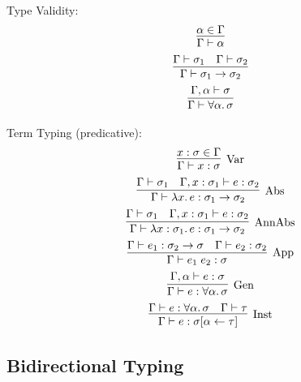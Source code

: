 Type Validity:
\begin{gather*}
  \infer{
    \Gamma \vdash \alpha
  }{
    \alpha \in \Gamma
  }
  \\
  \infer{
    \Gamma \vdash \sigma_1 \to \sigma_2
  }{
    \Gamma \vdash \sigma_1
    &
    \Gamma \vdash \sigma_2
  }
  \\
  \infer{
    \Gamma \vdash \forall \alpha\ldotp \sigma
  }{
    \Gamma, \alpha \vdash \sigma
  }
\end{gather*}

Term Typing (predicative):
\begin{gather*}
  \infer[\text{Var}]{
    \Gamma \vdash x: \sigma
  }{
    x:\sigma \in \Gamma
  }
  \\
  \infer[\text{Abs}]{
    \Gamma \vdash \lambda x\ldotp e: \sigma_1 \to \sigma_2
  }{
    \Gamma \vdash \sigma_1
    &
    \Gamma, x: \sigma_1\vdash e: \sigma_2
  }
  \\
  \infer[\text{AnnAbs}]{
    \Gamma \vdash \lambda x: \sigma_1\ldotp e: \sigma_1 \to \sigma_2
  }{
    \Gamma \vdash \sigma_1
    &
    \Gamma, x: \sigma_1\vdash e: \sigma_2
  }
  \\
  \infer[\text{App}]{
    \Gamma \vdash e_1\; e_2: \sigma
  }{
    \Gamma \vdash e_1: \sigma_2 \to \sigma
    &
    \Gamma \vdash e_2: \sigma_2
  }
  \\
  \infer[\text{Gen}]{
    \Gamma \vdash e: \forall \alpha\ldotp \sigma
  }{
    \Gamma, \alpha \vdash e: \sigma
  }
  \\
  \infer[\text{Inst}]{
    \Gamma \vdash e: \sigma[\alpha \assign \tau]
  }{
    \Gamma \vdash e: \forall \alpha\ldotp \sigma
    &
    \Gamma \vdash \tau
  }
\end{gather*}

\subsection{Bidirectional Typing}


